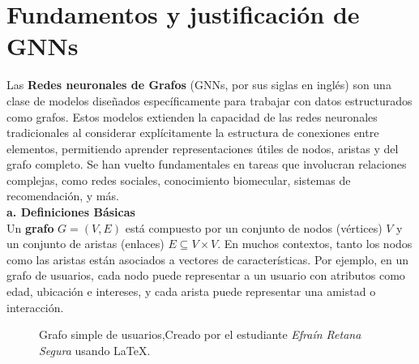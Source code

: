 \documentclass[11pt]{article} %
\begin{document}
\newpage
{\section*{Fundamentos y justificación de GNNs}} 
\vspace{5pt}
Las \textbf{Redes neuronales de Grafos} (GNNs, por sus siglas en inglés) son una clase de modelos diseñados específicamente para trabajar con datos estructurados como grafos. Estos modelos extienden la capacidad de las redes neuronales tradicionales al considerar explícitamente la estructura de conexiones entre elementos, permitiendo aprender representaciones útiles de nodos, aristas y del grafo completo. Se han vuelto fundamentales en tareas que involucran relaciones complejas, como redes sociales, conocimiento biomecular, sistemas de recomendación, y más. \\[3pt]
\textbf{a. Definiciones Básicas} \\[3pt]
Un \textbf{grafo} $G = (V, E)$ está compuesto por un conjunto de nodos (vértices) $V$ y un conjunto de aristas (enlaces) $E \subseteq V \times V$. En muchos contextos, tanto los nodos como las aristas están asociados a vectores de características. Por ejemplo, en un grafo de usuarios, cada nodo puede representar a un usuario con atributos como edad, ubicación e intereses, y cada arista puede representar una amistad o interacción.
\begin{figure}[h]
\centering
{}
\caption{Grafo simple de usuarios,Creado por el estudiante \textit{Efraín Retana Segura} usando \LaTeX.}
\label{fig:grafo_simple}
\end{figure}
\end{document}
